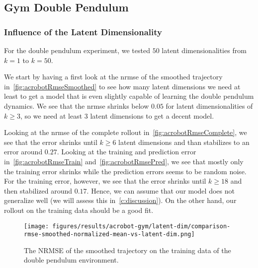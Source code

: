 	\subsection{Gym Double Pendulum}
		\subsubsection{Influence of the Latent Dimensionality}
			For the double pendulum experiment, we tested \(50\) latent dimensionalities from \( k = 1 \) to \( k = 50 \).

			We start by having a first look at the \ac{nrmse} of the smoothed trajectory in~\autoref{fig:acrobotRmseSmoothed} to see how many latent dimensions we need at least to get a model that is even slightly capable of learning the double pendulum dynamics. We see that the \ac{nrmse} shrinks below \(0.05\) for latent dimensionalities of \( k \geq 3 \), so we need at least \(3\) latent dimensions to get a decent model.

			Looking at the \ac{nrmse} of the complete rollout in~\autoref{fig:acrobotRmseComplete}, we see that the error shrinks until \( k \geq 6 \) latent dimensions and than stabilizes to an error around \( 0.27 \). Looking at the training and prediction error in~\autoref{fig:acrobotRmseTrain} and~\autoref{fig:acrobotRmsePred}, we see that mostly only the training error shrinks while the prediction errors seems to be random noise. For the training error, however, we see that the error shrinks until \( k \geq 18 \) and then stabilized around \( 0.17 \). Hence, we can assume that our model does not generalize well (we will assess this in~\autoref{c:discussion}). On the other hand, our rollout on the training data should be a good fit.

			\begin{figure}
				\centering
				\texttt{[image: figures/results/acrobot-gym/latent-dim/comparison-rmse-smoothed-normalized-mean-vs-latent-dim.png]}
				\caption[Error of the smoothed trajectory on the training data of the double pendulum experiment]{The NRMSE of the smoothed trajectory on the training data of the double pendulum environment.}
				\label{fig:acrobotRmseSmoothed}
			\end{figure}

